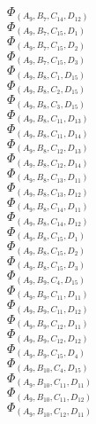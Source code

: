 \documentclass[14pt]{article}
\begin{document}
    $\Phi_{({A}_{9}, {B}_{7}, {C}_{14}, {D}_{12})}$ \\ 
    $\Phi_{({A}_{9}, {B}_{7}, {C}_{15}, {D}_{1})}$ \\ 
    $\Phi_{({A}_{9}, {B}_{7}, {C}_{15}, {D}_{2})}$ \\ 
    $\Phi_{({A}_{9}, {B}_{7}, {C}_{15}, {D}_{3})}$ \\ 
    $\Phi_{({A}_{9}, {B}_{8}, {C}_{1}, {D}_{15})}$ \\ 
    $\Phi_{({A}_{9}, {B}_{8}, {C}_{2}, {D}_{15})}$ \\ 
    $\Phi_{({A}_{9}, {B}_{8}, {C}_{3}, {D}_{15})}$ \\ 
    $\Phi_{({A}_{9}, {B}_{8}, {C}_{11}, {D}_{13})}$ \\ 
    $\Phi_{({A}_{9}, {B}_{8}, {C}_{11}, {D}_{14})}$ \\ 
    $\Phi_{({A}_{9}, {B}_{8}, {C}_{12}, {D}_{13})}$ \\ 
    $\Phi_{({A}_{9}, {B}_{8}, {C}_{12}, {D}_{14})}$ \\ 
    $\Phi_{({A}_{9}, {B}_{8}, {C}_{13}, {D}_{11})}$ \\ 
    $\Phi_{({A}_{9}, {B}_{8}, {C}_{13}, {D}_{12})}$ \\ 
    $\Phi_{({A}_{9}, {B}_{8}, {C}_{14}, {D}_{11})}$ \\ 
    $\Phi_{({A}_{9}, {B}_{8}, {C}_{14}, {D}_{12})}$ \\ 
    $\Phi_{({A}_{9}, {B}_{8}, {C}_{15}, {D}_{1})}$ \\ 
    $\Phi_{({A}_{9}, {B}_{8}, {C}_{15}, {D}_{2})}$ \\ 
    $\Phi_{({A}_{9}, {B}_{8}, {C}_{15}, {D}_{3})}$ \\ 
    $\Phi_{({A}_{9}, {B}_{9}, {C}_{4}, {D}_{15})}$ \\ 
    $\Phi_{({A}_{9}, {B}_{9}, {C}_{11}, {D}_{11})}$ \\ 
    $\Phi_{({A}_{9}, {B}_{9}, {C}_{11}, {D}_{12})}$ \\ 
    $\Phi_{({A}_{9}, {B}_{9}, {C}_{12}, {D}_{11})}$ \\ 
    $\Phi_{({A}_{9}, {B}_{9}, {C}_{12}, {D}_{12})}$ \\ 
    $\Phi_{({A}_{9}, {B}_{9}, {C}_{15}, {D}_{4})}$ \\ 
    $\Phi_{({A}_{9}, {B}_{10}, {C}_{4}, {D}_{15})}$ \\ 
    $\Phi_{({A}_{9}, {B}_{10}, {C}_{11}, {D}_{11})}$ \\ 
    $\Phi_{({A}_{9}, {B}_{10}, {C}_{11}, {D}_{12})}$ \\ 
    $\Phi_{({A}_{9}, {B}_{10}, {C}_{12}, {D}_{11})}$ \\ 
\end{document}
